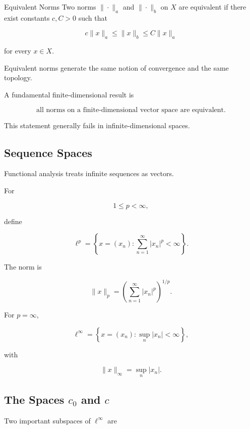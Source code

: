 \begin{definitionbox}{Equivalent Norms}
Two norms \(\|\cdot\|_a\) and \(\|\cdot\|_b\) on \(X\) are equivalent if
there exist constants \(c,C>0\) such that

\[
\boxed{
c\|x\|_a
\leq
\|x\|_b
\leq
C\|x\|_a
}
\]

for every \(x\in X\).
\end{definitionbox}

Equivalent norms generate the same notion of convergence and the same
topology.

A fundamental finite-dimensional result is

\[
\boxed{
\text{all norms on a finite-dimensional vector space are equivalent}.
}
\]

This statement generally fails in infinite-dimensional spaces.

\subsection{Sequence Spaces}
\label{subsec:sequence-spaces-functional}

Functional analysis treats infinite sequences as vectors.

For

\[
1\leq p<\infty,
\]

define

\[
\boxed{
\ell^p
=
\left\{
x=(x_n):
\sum_{n=1}^{\infty}|x_n|^p<\infty
\right\}.
}
\]

The norm is

\[
\boxed{
\|x\|_p
=
\left(
\sum_{n=1}^{\infty}|x_n|^p
\right)^{1/p}.
}
\]

For \(p=\infty\),

\[
\boxed{
\ell^\infty
=
\left\{
x=(x_n):
\sup_n|x_n|<\infty
\right\},
}
\]

with

\[
\boxed{
\|x\|_\infty
=
\sup_n|x_n|.
}
\]

\subsection{The Spaces \(c_0\) and \(c\)}
\label{subsec:c0-c-spaces}

Two important subspaces of \(\ell^\infty\) are


